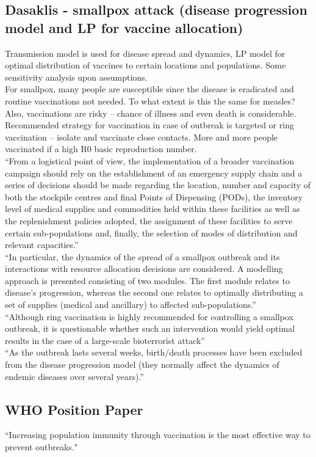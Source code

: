 \subsection{Dasaklis - smallpox attack (disease progression model and LP for vaccine allocation)}
\citep{dasaklis2017emergency}
Transmission model is used for disease spread and dynamics, LP model for optimal distribution of vaccines to certain locations and populations. Some sensitivity analysis upon assumptions. \\
For smallpox, many people are susceptible since the disease is eradicated and routine vaccinations not needed. To what extent is this the same for measles? Also, vaccinations are risky – chance of illness and even death is considerable. Recommended strategy for vaccination in case of outbreak is targeted or ring vaccination – isolate and vaccinate close contacts. More and more people vaccinated if a high R0 basic reproduction number. \\
``From a logistical point of view,
the implementation of a broader vaccination campaign
should rely on the establishment of an emergency supply
chain and a series of decisions should be made regarding
the location, number and capacity of both the stockpile
centres and final Points of Dispensing (PODs), the
inventory level of medical supplies and commodities
held within these facilities as well as the replenishment
policies adopted, the assignment of these facilities to
serve certain sub-populations and, finally, the selection
of modes of distribution and relevant capacities.” \\
``In particular, the dynamics of the
spread of a smallpox outbreak and its interactions with
resource allocation decisions are considered. A modelling
approach is presented consisting of two modules. The
first module relates to disease’s progression, whereas the
second one relates to optimally distributing a set of supplies
(medical and ancillary) to affected sub-populations.” \\
``Although ring vaccination is highly recommended for
controlling a smallpox outbreak, it is questionable
whether such an intervention would yield optimal results
in the case of a large-scale bioterrorist attack” \\
``As the outbreak lasts several
weeks, birth/death processes have been excluded from
the disease progression model (they normally affect the
dynamics of endemic diseases over several years).” \\


\subsection{WHO Position Paper}
\citep{world2017measles}
``Increasing population immunity through vaccination is the most effective way to prevent outbreaks."

